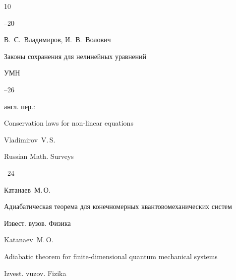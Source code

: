 \begin{thebibliography}{10}


--20






\by В.~С.~Владимиров, И.~В.~Волович

\paper Законы сохранения для нелинейных уравнений

\jour УМН



--26


\transl англ. пер.:~

\paper Conservation laws for non-linear equations

\by  Vladimirov~V.\,S.


\jour Russian Math. Surveys




--24




\by Катанаев~М.\,О.

\paper Адиабатическая теорема для конечномерных квантовомеханических систем

\jour Извест. вузов. Физика



\toappear 

\misctransl

\by Katanaev~M.\,O. 

\paper Adiabatic theorem for finite-dimensional quantum mechanical systems

\jour Izvest. vuzov. Fizika



\toappear 





\end{thebibliography}



\hskip6.5cm \thedate \par

\hskip6.5cm\therevdate\par

\newpage










\makeengtitlem



\renewcommand{\baselinestretch}{.9}



\newpage





%

